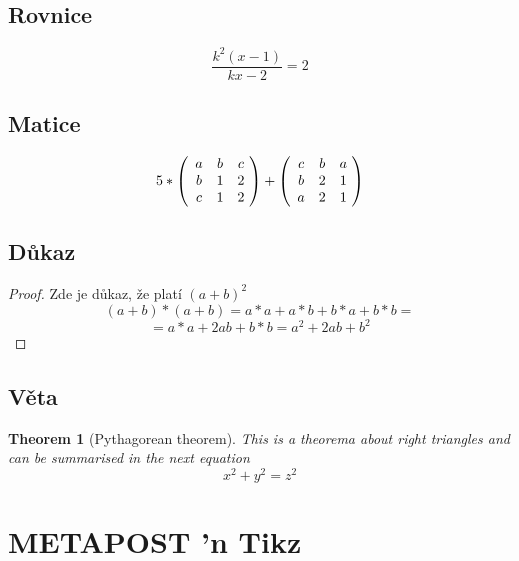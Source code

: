 \documentclass[12pt,a4paper]{article}
\newtheorem{theorem}{Theorem}
\begin{document}
{{	\subsection{Rovnice}
	\label{rovnice}
	\begin{displaymath}
	\frac {k^2(x-1)}{kx-2} = 2 
	\end{displaymath}
	
	\subsection{Matice}
	\label{matice}
	$$5* \left(
	\begin{array}{ccc@{\ }r}
    a & b & c \\
    b & 1 & 2 \\
    c & 1 & 2 \\
    \end{array}
    \right) + 
    \left(
	\begin{array}{ccc@{\ }r}
    c & b & a \\
    b & 2 & 1 \\
    a & 2 & 1 \\
    \end{array}
    \right)$$
    
    \subsection{Důkaz}
    \label{dukaz}
    \begin{proof}
	Zde je důkaz, že platí 
	$(a+b)^{2}$
	\[
	(a+b)*(a+b) = a*a+a*b+b*a+b*b =
	\]
	\[
	= a*a+2ab+b*b = a^2+2ab+b^2
	\]
	\end{proof}
	
	\subsection{Věta}
	\label{veta}
	\begin{theorem}[Pythagorean theorem]
	\label{pythagorean}
	This is a theorema about right triangles and can be summarised in the next equation 
	\[ x^2 + y^2 = z^2 \]
	\end{theorem}
	\newpage
	\section{METAPOST 'n Tikz}
}}
\end{document}
